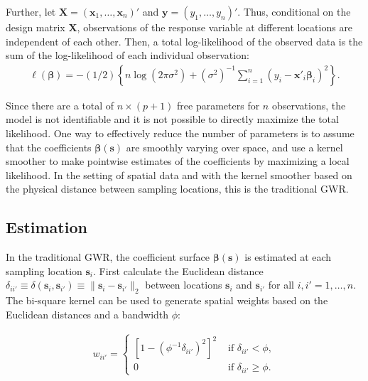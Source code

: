 \documentclass[authoryear, review, 11pt]{elsarticle}
\begin{document}
	Further, let $\bm{X} = \left( \bm{x}_1, \dots, \bm{x}_n \right)'$ and $\bm{y} = \left( y_1, \dots, y_n \right)'$. Thus, conditional on the design matrix $\bm{X}$, observations of the response variable at different locations are independent of each other. Then, a total log-likelihood of the observed data is the sum of the log-likelihood of each individual observation:
	 \begin{align}
	 	\ell\left( \bm{\beta} \right) = - \left(1/2\right) \left\{ n \log \left( 2 \pi \sigma^2\right) +  \left(\sigma^{2}\right)^{-1}  \sum_{i=1}^n \left(y_i - \bm{x}'_i\bm{\beta}_i \right)^2  \right\}.
	\end{align}
	
	Since there are a total of $n \times (p+1)$ free parameters for $n$ observations, the model is not identifiable and it is not possible to directly maximize the total likelihood. One way to effectively reduce the number of parameters is to assume that the coefficients $\bm{\beta}(\bm{s})$ are smoothly varying over space, and use a kernel smoother to make pointwise estimates of the coefficients by maximizing a local likelihood. In the setting of spatial data and with the kernel smoother based on the physical distance between sampling locations, this is the traditional GWR.
		
	\subsection{Estimation}		
	In the traditional GWR, the coefficient surface $\bm{\beta}(\bm{s})$ is estimated at each sampling location $\bm{s}_i$. First calculate the Euclidean distance $\delta_{ii'} \equiv \delta\left(\bm{s}_i, \bm{s}_{i'}\right) \equiv \|\bm{s}_i  -\bm{s}_{i'}\|_2$ between locations $\bm{s}_i$ and $\bm{s}_{i'}$ for all $i, i' = 1, \dots, n$. The bi-square kernel can be used to generate spatial weights based on the Euclidean distances and a bandwidth $\phi$:
	
	\begin{align}\label{eq:bisquare}
		w_{ii'} = \begin{cases} \left[1-\left(\phi^{-1}\delta_{ii'}\right)^2\right]^2 &\mbox{ if } \delta_{ii'} < \phi, \\ 0 &\mbox{ if } \delta_{ii'} \geq \phi. \end{cases}
	\end{align}
	
\end{document}
